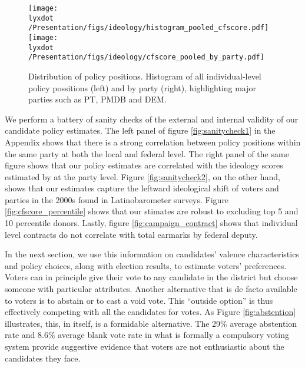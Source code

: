 \documentclass[12pt,english]{article}
\newcommand{\lyxdot}{.}
\numberwithin{equation}{section}
\theoremstyle{plain}
\theoremstyle{remark}
\theoremstyle{plain}
\begin{document}


\begin{figure}[h]
  \centering
  \texttt{[image: \\lyxdot /Presentation/figs/ideology/histogram\_pooled\_cfscore.pdf]}
  \texttt{[image: \\lyxdot /Presentation/figs/ideology/cfscore\_pooled\_by\_party.pdf]}
  \caption{Distribution of policy positions. Histogram of all individual-level policy possitions (left) and by party (right), highlighting major parties such as PT, PMDB and DEM.}
  \label{fig:cfscore_hist}
\end{figure} 

We perform a battery of sanity checks of the external and internal validity of our candidate policy estimates.  The left panel of figure \ref{fig:sanitycheck1} in the Appendix shows that there is a strong correlation between policy positions within the same party at both the local and federal level. The right panel of the same figure shows that our policy estimates are correlated with the ideology scores estimated by   at the party level. Figure \ref{fig:sanitycheck2}, on the other hand, shows that our estimates capture the leftward ideological shift of voters and parties in the 2000s found in Latinobarometer surveys. Figure \ref{fig:cfscore_percentile} shows that our stimates are robust to excluding top 5 and 10 percentile donors. Lastly, figure \ref{fig:campaign_contract} shows that individual level contracts do not correlate with total earmarks by federal deputy.%

In the next section, we use this information on candidates' valence characteristics and policy choices, along with election results, to estimate voters' preferences. Voters can in principle give their vote to any candidate in the district but choose someone with particular attributes. Another alternative that is de facto available to voters is to abstain or to cast a void vote. This ``outside option'' is thus effectively competing with all the candidates for votes. As Figure  \ref{fig:abstention} illustrates, this, in itself, is a formidable alternative. The 29\% average abstention rate and 8.6\% average blank vote rate in what is formally a compulsory voting system provide suggestive evidence that voters are not enthusiastic about the candidates they face.
\end{document}
